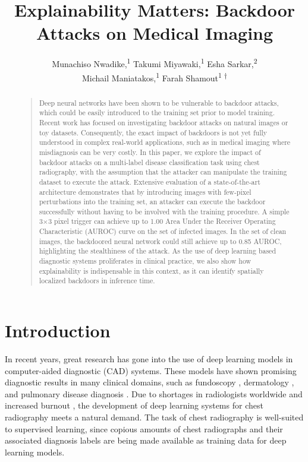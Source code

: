 \documentclass[letterpaper]{article} %
\title{Explainability Matters:  Backdoor Attacks on Medical Imaging}
\author {
        Munachiso Nwadike,\textsuperscript{\rm*1}
        Takumi Miyawaki,\textsuperscript{\rm*1}
        Esha Sarkar,\textsuperscript{\rm 2} \\
        Michail Maniatakos,\textsuperscript{\rm 1}
        Farah Shamout\textsuperscript{\rm 1 $\dagger$}  \\
}
\begin{document}
\maketitle

\begin{abstract} 
\begin{quote}
Deep neural networks have been shown to be vulnerable to backdoor attacks, which could be easily introduced to the training set prior to model training. Recent work has focused on investigating backdoor attacks on natural images or toy datasets. Consequently, the exact impact of backdoors is not yet fully understood in complex real-world applications, such as in medical imaging where misdiagnosis can be very costly. In this paper, we explore the impact of backdoor attacks on a multi-label disease classification task using chest radiography, with the assumption that the attacker can manipulate the training dataset to execute the attack. Extensive evaluation of a state-of-the-art architecture demonstrates that by introducing images with few-pixel perturbations into the training set, an attacker can execute the backdoor successfully without having to be involved with the training procedure. A simple 3$\times$3 pixel trigger can achieve up to 1.00 Area Under the Receiver Operating Characteristic (AUROC) curve on the set of infected images. In the set of clean images, the backdoored neural network could still achieve up to 0.85 AUROC, highlighting the stealthiness of the attack. As the use of deep learning based diagnostic systems proliferates in clinical practice, we also show how explainability is indispensable in this context, as it can identify spatially localized backdoors in inference time.

\end{quote}
\end{abstract}

\section{Introduction}

\noindent In recent years, great research has gone into the use of deep learning models in computer-aided diagnostic (CAD) systems. These models have shown promising diagnostic results in many clinical domains, such as fundoscopy \cite{asiri2019deep}, dermatology \cite{liu2020deep,esteva2017dermatologist}, and pulmonary disease diagnosis \cite{shoeibi2020automated,rajpurkar2017chexnet,gabruseva2020deep}. Due to shortages in radiologists worldwide and increased burnout \cite{wuni2020opportunities,ali2015diagnostic, kumamaru2018global,zha2018prevalence,rimmer2017radiologist}, the development of deep learning systems for chest radiography meets a natural demand. The task of chest radiography is well-suited to supervised learning, since copious amounts of chest radiographs and their associated diagnosis labels are being made available as training data for deep learning models.
\end{document}
